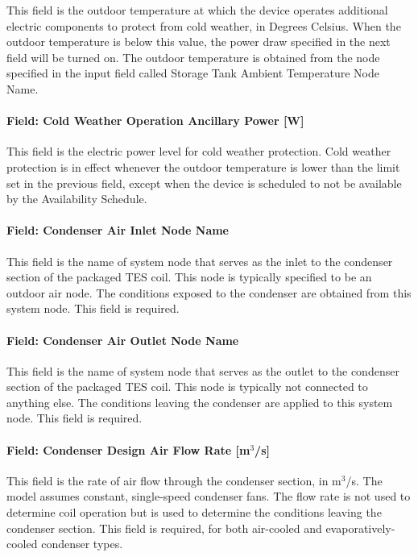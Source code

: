 This field is the outdoor temperature at which the device operates additional electric components to protect from cold weather, in Degrees Celsius. When the outdoor temperature is below this value, the power draw specified in the next field will be turned on. The outdoor temperature is obtained from the node specified in the input field called Storage Tank Ambient Temperature Node Name.

\paragraph{Field: Cold Weather Operation Ancillary Power {[}W{]}}\label{field-cold-weather-operation-ancillary-power-w}

This field is the electric power level for cold weather protection. Cold weather protection is in effect whenever the outdoor temperature is lower than the limit set in the previous field, except when the device is scheduled to not be available by the Availability Schedule.

\paragraph{Field: Condenser Air Inlet Node Name}\label{field-condenser-air-inlet-node-name-5}

This field is the name of system node that serves as the inlet to the condenser section of the packaged TES coil. This node is typically specified to be an outdoor air node. The conditions exposed to the condenser are obtained from this system node. This field is required.

\paragraph{Field: Condenser Air Outlet Node Name}\label{field-condenser-air-outlet-node-name}

This field is the name of system node that serves as the outlet to the condenser section of the packaged TES coil. This node is typically not connected to anything else. The conditions leaving the condenser are applied to this system node. This field is required.

\paragraph{Field: Condenser Design Air Flow Rate {[}m\(^{3}\)/s{]}}\label{field-condenser-design-air-flow-rate-m3s}

This field is the rate of air flow through the condenser section, in m\(^{3}\)/s. The model assumes constant, single-speed condenser fans. The flow rate is not used to determine coil operation but is used to determine the conditions leaving the condenser section. This field is required, for both air-cooled and evaporatively-cooled condenser types.


